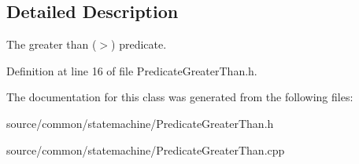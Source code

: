 \subsection{Detailed Description}
The greater than ($>$) predicate. 

Definition at line 16 of file Predicate\-Greater\-Than.\-h.



The documentation for this class was generated from the following files\-:\begin{DoxyCompactItemize}
\item 
source/common/statemachine/Predicate\-Greater\-Than.\-h\item 
source/common/statemachine/Predicate\-Greater\-Than.\-cpp\end{DoxyCompactItemize}
